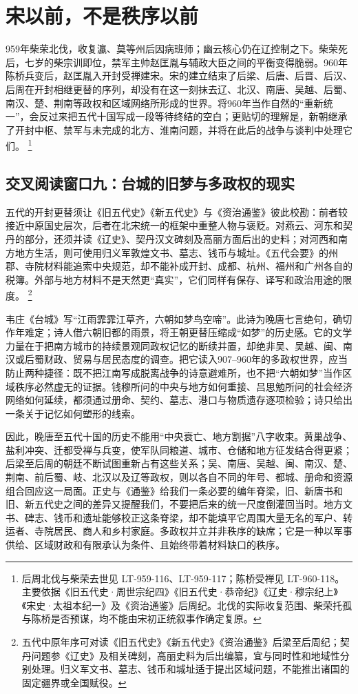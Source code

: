 \section{宋以前，不是秩序以前}

959年柴荣北伐，收复瀛、莫等州后因病班师；幽云核心仍在辽控制之下。柴荣死后，七岁的柴宗训即位，禁军主帅赵匡胤与辅政大臣之间的平衡变得脆弱。960年陈桥兵变后，赵匡胤入开封受禅建宋。宋的建立结束了后梁、后唐、后晋、后汉、后周在开封相继更替的序列，却没有在这一刻抹去辽、北汉、南唐、吴越、后蜀、南汉、楚、荆南等政权和区域网络所形成的世界。将960年当作自然的“重新统一”，会反过来把五代十国写成一段等待终结的空白；更贴切的理解是，新朝继承了开封中枢、禁军与未完成的北方、淮南问题，并将在此后的战争与谈判中处理它们。%
\footnote{后周北伐与柴荣去世见 LT-959-116、LT-959-117；陈桥受禅见 LT-960-118。主要依据《旧五代史·周世宗纪四》《旧五代史·恭帝纪》《辽史·穆宗纪上》《宋史·太祖本纪一》及《资治通鉴》后周纪。北伐的实际收复范围、柴荣托孤与陈桥是否预谋，均不能由宋初正统叙事作确定复原。}

\subsection{交叉阅读窗口九：台城的旧梦与多政权的现实}

五代的开封更替须让《旧五代史》《新五代史》与《资治通鉴》彼此校勘：前者较接近中原国史层次，后者在北宋统一的框架中重整人物与褒贬。对燕云、河东和契丹的部分，还须并读《辽史》、契丹汉文碑刻及高丽方面后出的史料；对河西和南方地方生活，则可使用归义军敦煌文书、墓志、钱币与城址。《五代会要》的州郡、寺院材料能追索中央规范，却不能补成开封、成都、杭州、福州和广州各自的税簿。外部与地方材料不是天然更“真实”，它们同样有保存、译写和政治用途的限度。%
\footnote{五代中原年序可对读《旧五代史》《新五代史》《资治通鉴》后梁至后周纪；契丹问题参《辽史》及相关碑刻，高丽史料为后出编纂，宜与同时性和地域性分别处理。归义军文书、墓志、钱币和城址适于提出区域问题，不能推出诸国的固定疆界或全国赋役。}

韦庄《台城》写“江雨霏霏江草齐，六朝如梦鸟空啼”。此诗为晚唐七言绝句，确切作年难定；诗人借六朝旧都的雨景，将王朝更替压缩成“如梦”的历史感。它的文学力量在于把南方城市的持续景观同政权记忆的断续并置，却绝非吴、吴越、闽、南汉或后蜀财政、贸易与居民态度的调查。把它读入907--960年的多政权世界，应当防止两种捷径：既不把江南写成脱离战争的诗意避难所，也不把“六朝如梦”当作区域秩序必然虚无的证据。钱穆所问的中央与地方如何重接、吕思勉所问的社会经济网络如何延续，都须通过册命、契约、墓志、港口与物质遗存逐项检验；诗只给出一条关于记忆如何塑形的线索。

因此，晚唐至五代十国的历史不能用“中央衰亡、地方割据”八字收束。黄巢战争、盐利冲突、迁都受禅与兵变，使军队同粮道、城市、仓储和地方征发结合得更紧；后梁至后周的朝廷不断试图重新占有这些关系；吴、南唐、吴越、闽、南汉、楚、荆南、前后蜀、岐、北汉以及辽等政权，则以各自不同的年号、都城、册命和资源组合回应这一局面。正史与《通鉴》给我们一条必要的编年脊梁，旧、新唐书和旧、新五代史之间的差异又提醒我们，不要把后来的统一尺度倒灌回当时。地方文书、碑志、钱币和遗址能够校正这条脊梁，却不能填平它周围大量无名的军户、转运者、寺院居民、商人和乡村家庭。多政权并立并非秩序的缺席；它是一种以军事供给、区域财政和有限承认为条件、且始终带着材料缺口的秩序。
